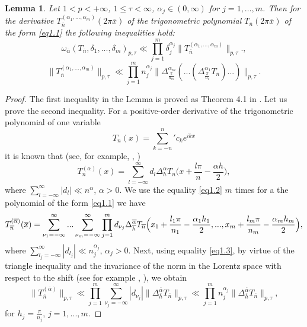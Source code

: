 \documentclass[12pt]{article}
\theoremstyle{plain}
\newtheorem{lemma}{Lemma}[section]
\begin{document}
\begin{lemma}\label{lem1 2} 
Let $1 < p < +\infty$, $1\leqslant \tau<\infty$,
$\alpha_{j}\in (0, \infty)$ for $j=1, \ldots , m$. Then for the derivative $T_{\overline{n}}^{(\alpha_{1},...,\alpha_{m})}(2\pi\overline{x})$ 
of the trigonometric polynomial $T_{\overline{n}}(2\pi\overline{x})$ of the form \eqref{eq1.1} 
the following inequalities hold:
\begin{equation*}
 \omega_{\overline{\alpha}}(T_{\overline{n}}, \delta_{1}, ...,\delta_{m})_{p, \tau}\ll 
\prod_{j=1}^{m}\delta_{j}^{\alpha_{j}}\|T_{\overline{n}}^{(\alpha_{1},...,\alpha_{m})}\|_{p, \tau}.,
\end{equation*}
\begin{equation*}
\|T_{\overline{n}}^{(\alpha_{1},...,\alpha_{m})}\|_{p, \tau}\ll \prod_{j=1}^{m}n_{j}^{\alpha_{j}}\|\Delta_{\frac{\pi}{n_{m}}}^{\alpha_{m}}(...(\Delta_{\frac{\pi}{n_{1}}}^{\alpha_{1}}T_{\overline{n}})...)\|_{p, \tau}.
\end{equation*}
\end{lemma}
\begin{proof} The first inequality in the Lemma is proved as Theorem 4.1 in \cite{17}. 
Let us prove the second inequality. For a positive-order derivative of the trigonometric polynomial of one variable 
  \begin{equation*}
 T_{n}(x) = {\sum\limits_{k=-n}^{n}}'c_{k}e^{ikx}
 \end{equation*}
 it is known that (see, for example, \cite{23}, \cite{18})
   \begin{equation}\label{eq1.2}
 T_{n}^{(\alpha)}(x) =\sum_{l=-\infty}^{\infty}d_{l}\Delta_{h}^{\alpha}T_{n}\bigl(x+\frac{l\pi}{n}-\frac{\alpha h}{2}\bigr),
 \end{equation}
where  
$\sum_{l=-\infty}^{\infty}|d_{l}|\ll n^{\alpha}$, $\alpha > 0$. We use the equality \eqref{eq1.2} $m$ times for a
the polynomial of the form \eqref{eq1.1} we have
   \begin{equation}\label{eq1.3}
T_{\overline{n}}^{(\overline\alpha)}(\overline{x})=\sum_{\nu_{1}=-\infty}^{\infty}...\sum_{\nu_{m}=-\infty}^{\infty}\prod_{j=1}^{m}d_{\nu_{j}}\Delta_{\overline{h}}^{\overline\alpha}T_{\overline{n}}\Bigl(x_{1}+\frac{l_{1}\pi}{n_{1}}-\frac{\alpha_{1}h_{1}}{2},..., x_{m}+\frac{l_{m}\pi}{n_{m}}-\frac{\alpha_{m}h_{m}}{2}\Bigr),
\end{equation} 
where 
 $\sum_{l_{j}=-\infty}^{\infty}|d_{l_{j}}|\ll n_{j}^{\alpha_{j}}$, $\alpha_{j} > 0$.
Next, using equality \eqref{eq1.3}, by virtue of the triangle inequality and the invariance of the norm in the Lorentz space with respect to the shift (see for example \cite{7}, \cite{12}), we obtain 
   \begin{equation*}
  \|T_{\overline{n}}^{(\overline\alpha)}\|_{p, \tau}\ll \prod_{j=1}^{m}\sum_{\nu_{j}=-\infty}^{\infty}|d_{\nu_{j}}|\|\Delta_{\overline{h}}^{\overline\alpha}T_{\overline{n}}\|_{p, \tau} \ll \prod_{j=1}^{m}n_{j}^{\alpha_{j}}\|\Delta_{\overline{h}}^{\overline\alpha}T_{\overline{n}}\|_{p, \tau},
   \end{equation*}
for $h_{j}=\frac{\pi}{n_{j}}$,  $j=1,...,m$.
\end{proof}
\end{document}
